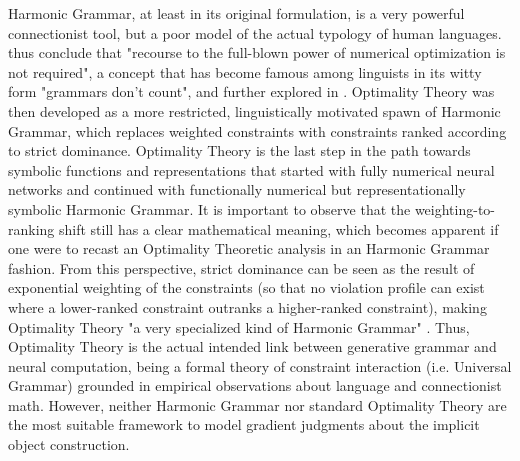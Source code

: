 Harmonic Grammar, at least in its original formulation, is a very powerful connectionist tool, but a poor model of the actual typology of human languages. \textcite[216]{princesmolensky1993optimality} thus conclude that "recourse to the full-blown power of numerical optimization is not required", a concept that has become famous among linguists in its witty form "grammars don't count", and further explored in \textcite{smolensky2006harmony}. Optimality Theory was then developed as a more restricted, linguistically motivated spawn of Harmonic Grammar, which replaces weighted constraints with constraints ranked according to strict dominance. Optimality Theory is the last step in the path towards symbolic functions and representations that started with fully numerical neural networks and continued with functionally numerical but representationally symbolic Harmonic Grammar. It is important to observe that the weighting-to-ranking shift still has a clear mathematical meaning, which becomes apparent if one were to recast an Optimality Theoretic analysis in an Harmonic Grammar fashion. From this perspective, strict dominance can be seen as the result of exponential weighting of the constraints (so that no violation profile can exist where a lower-ranked constraint outranks a higher-ranked constraint), making Optimality Theory "a very specialized kind of Harmonic Grammar" \parencite{princesmolensky1993optimality, PrinceSmolensky2008}. Thus, Optimality Theory is the actual intended link between generative grammar and neural computation, being a formal theory of constraint interaction (i.e. Universal Grammar) grounded in empirical observations about language and connectionist math. However, neither Harmonic Grammar nor standard Optimality Theory are the most suitable framework to model gradient judgments about the implicit object construction.


